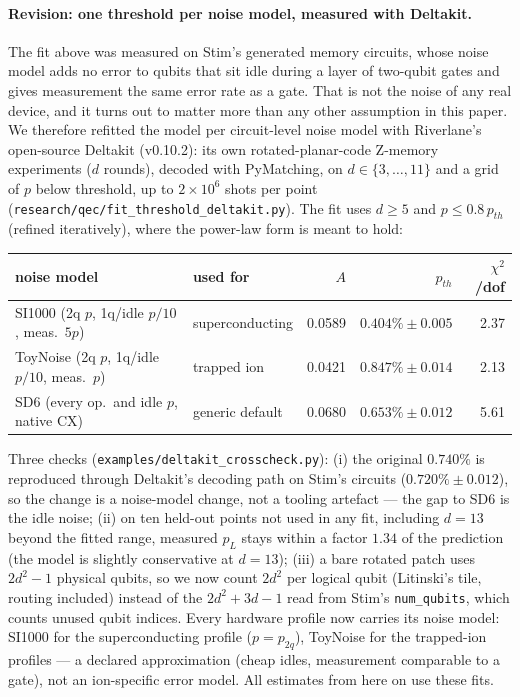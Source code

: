 \documentclass[9pt,twocolumn]{extarticle}
\begin{document}
\paragraph{Revision: one threshold per noise model, measured with Deltakit.}
The fit above was measured on Stim's generated memory circuits, whose noise
model adds no error to qubits that sit idle during a layer of two-qubit
gates and gives measurement the same error rate as a gate. That is not the
noise of any real device, and it turns out to matter more than any other
assumption in this paper. We therefore refitted the model per circuit-level
noise model with Riverlane's open-source Deltakit (v0.10.2): its own
rotated-planar-code Z-memory experiments ($d$ rounds), decoded with
PyMatching, on $d\in\{3,\dots,11\}$ and a grid of $p$ below threshold, up to
$2\times10^6$ shots per point (\texttt{research/qec/fit\_threshold\_deltakit.py}).
The fit uses $d\geq5$ and $p\leq0.8\,p_{th}$ (refined iteratively), where the
power-law form is meant to hold:
\begin{center}
\begin{tabular}{llrrr}
\toprule
noise model & used for & $A$ & $p_{th}$ & $\chi^2$/dof \\
\midrule
SI1000 (2q $p$, 1q/idle $p/10$, meas.\ $5p$) & superconducting & 0.0589 & $0.404\%\pm0.005$ & 2.37 \\
ToyNoise (2q $p$, 1q/idle $p/10$, meas.\ $p$) & trapped ion & 0.0421 & $0.847\%\pm0.014$ & 2.13 \\
SD6 (every op.\ and idle $p$, native CX) & generic default & 0.0680 & $0.653\%\pm0.012$ & 5.61 \\
\bottomrule
\end{tabular}
\end{center}
Three checks (\texttt{examples/deltakit\_crosscheck.py}): (i) the original
$0.740\%$ is reproduced through Deltakit's decoding path on Stim's circuits
($0.720\%\pm0.012$), so the change is a noise-model change, not a tooling
artefact --- the gap to SD6 is the idle noise; (ii) on ten held-out points
not used in any fit, including $d=13$ beyond the fitted range, measured
$p_L$ stays within a factor $1.34$ of the prediction (the model is slightly
conservative at $d=13$); (iii) a bare rotated patch uses $2d^2-1$ physical
qubits, so we now count $2d^2$ per logical qubit (Litinski's tile, routing
included) instead of the $2d^2+3d-1$ read from Stim's \texttt{num\_qubits},
which counts unused qubit indices. Every hardware profile now carries its
noise model: SI1000 for the superconducting profile ($p=p_{2q}$), ToyNoise
for the trapped-ion profiles --- a declared approximation (cheap idles,
measurement comparable to a gate), not an ion-specific error model. All
estimates from here on use these fits.
\end{document}
